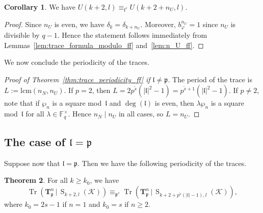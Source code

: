 \documentclass[10pt]{article}
\theoremstyle{definition}
\newtheorem{theorem}{Theorem}[section]
\newtheorem{corollary}[theorem]{Corollary}
\let\phi\varphi
\DeclareMathOperator\Tr{Tr}
\renewcommand{\:}{\colon}
\newcommand{\T}{\mathbf{T}}
\renewcommand{\S}{\operatorname{S}}
\newcommand{\bF}{\mathbb{F}}
\renewcommand{\l}{\mathfrak{l}}
\begin{document}
\begin{corollary}\label{cor:n_U_ff}
    We have $U(k+2,l) \equiv_{\l^s} U(k+2+n_U,l)$.
\end{corollary}

\begin{proof}
    Since $n_U$ is even, we have $\delta_k = \delta_{k+n_U}$. Moreover, $b_{\phi}^{n_U} = 1$ since $n_U$ is divisible by $q-1$. Hence the statement follows immediately from Lemmas~\ref{lem:trace_formula_modulo_ff} and~\ref{lem:n_U_ff}.
\end{proof}

We now conclude the periodicity of the traces.

\begin{proof}[Proof of Theorem~\ref{thm:trace_periodicity_ff} if $\l \neq \mathfrak p$]
    The period of the trace is $L := \text{lcm}(n_N,n_U)$. If $p=2$, then $L = 2p^{\tilde{s}}(|\l|^2-1) = p^{\tilde{s}+1}(|\l|^2-1)$. If $p \neq 2$, note that if $\wp_n$ is a square mod~$\l$ and $\deg(\l)$ is even, then $\lambda \wp_n$ is a square mod~$\l$ for all $\lambda \in \bF_q^\times$. Hence $n_N \mid n_U$ in all cases, so $L = n_U$.
\end{proof}

\subsection{The case of $\l = \mathfrak p$}
Suppose now that $\l = \mathfrak p$. Then we have the following periodicity of the traces.

\begin{theorem}
    For all $k \geq k_0$, we have
    \[
    \Tr(\T_{\mathfrak p}^n \, | \, \S_{k+2,l}({\mathcal K})) \equiv_{\mathfrak p^s} \Tr(\T_{\mathfrak p}^n \, | \, \S_{k+2+p^{\tilde{s}}(|\l|-1),l}({\mathcal K})),
    \]
    where $k_0 = 2s-1$ if $n = 1$ and $k_0 = s$ if $n \geq 2$.
\end{theorem}
\end{document}
